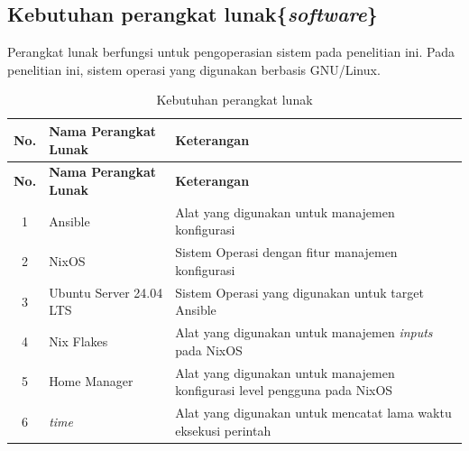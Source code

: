 \documentclass[10pt,]{report}
\begin{document}
\begin{adjustwidth}{20pt}{}
	\subsection{Kebutuhan perangkat lunak\{\textit{software}\} }
	\vspace{-2mm}
	\begin{adjustwidth}{20pt}{}
		Perangkat lunak berfungsi untuk pengoperasian sistem pada penelitian ini.
		Pada penelitian ini, sistem operasi yang digunakan berbasis GNU/Linux.\\
		\begin{longtable}[r]{|c|p{2cm}|>{\raggedright\arraybackslash}p{4.7cm}|}
			\caption{Kebutuhan perangkat lunak} \tabularnewline  \hline
			\textbf{No.} & \textbf{Nama Perangkat Lunak} & \textbf{Keterangan}                                                       \\
			\endfirsthead
			\textbf{No.} & \textbf{Nama Perangkat Lunak} & \textbf{Keterangan}                                                       \\
			\hline
			\endhead
			\hline
			1            & Ansible                       & Alat yang digunakan untuk manajemen konfigurasi                           \\
			\hline
			2            & NixOS                         & Sistem Operasi dengan fitur manajemen konfigurasi                         \\
			\hline
			3            & Ubuntu Server 24.04 LTS       & Sistem Operasi yang digunakan untuk target Ansible                        \\
			\hline
			4            & Nix Flakes                    & Alat yang digunakan untuk manajemen \textit{inputs} pada NixOS            \\
			\hline
			5            & Home Manager                  & Alat yang digunakan untuk manajemen konfigurasi level pengguna pada NixOS \\
			\hline
			6            & \textit{time}                 & Alat yang digunakan untuk mencatat lama waktu eksekusi perintah           \\
			\hline
		\end{longtable}
	\end{adjustwidth}
\end{adjustwidth}
\end{document}

